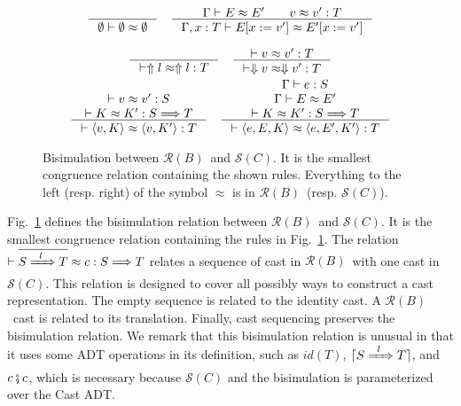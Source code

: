 \documentclass[runningheads]{llncs}
\newcommand{\infr}[2]{\inference{#1}{#2}}
\newcommand{\RMachine}[1]{\ensuremath{\mathcal{R}(#1)}}
\newcommand{\RBMachine}[0]{\RMachine{B}}
\newcommand{\SMachine}[1]{\ensuremath{\mathcal{S}(#1)}}
\newcommand{\error}[1]{\ensuremath{\Uparrow#1}}
\newcommand{\ccast}[3]{#1 \xRightarrow[]{\enskip #2 \enskip} #3}
\newcommand{\sexpr}[3]{\ensuremath{\langle#1,#2,#3\rangle}}
\newcommand{\scont}[2]{\ensuremath{\langle#1,#2\rangle}}
\newcommand{\shalt}[1]{\ensuremath{\Downarrow #1}}
\newcommand{\compose}[2]{\ensuremath{#1 \fatsemi #2}}
\newcommand{\translate}[1]{\ensuremath{\lceil#1\rceil}}
\newcommand{\id}[1]{\ensuremath{\mathit{id}(#1)}}
\newcommand{\expressiontyping}[3]{\ensuremath{#1 \vdash #2 : #3}}
\newcommand{\valuetyping}[2]{\ensuremath{\vdash #1 : #2}}
\newcommand{\casttyping}[3]{\ensuremath{\vdash #1 : #2 \Longrightarrow #3}}
\newcommand{\bisimE}[3]{\ensuremath{#1 \vdash #2 \approx #3}}
\newcommand{\bisimv}[3]{\valuetyping{#1 \approx #2}{#3}}
\newcommand{\bisimc}[4]{\casttyping{#1 \approx #2}{#3}{#4}}
\newcommand{\bisimK}[4]{\casttyping{#1 \approx #2}{#3}{#4}}
\newcommand{\bisims}[3]{\valuetyping{\ensuremath{#1 \approx #2}}{#3}}
\begin{document}
\begin{figure}
\fbox{\bisimE{\Gamma}{E}{E}}
\begin{gather*}
\inference{
}{
	\bisimE{\emptyset}{\emptyset}{\emptyset}
}
\quad
\inference{
	\Gamma \vdash E \approx E' \qquad
	v \approx v' : T
}{
	\Gamma , x : T \vdash 
	E [ x := v' ] \approx E' [ x := v' ]
}
\end{gather*}

\fbox{\bisims{s}{s}{T}}
\begin{gather*}
\infr{}{\bisims{\error{l}}{\error{l}}{T}} \quad
\infr{
	\bisimv{v}{v'}{T}
}{
	\bisims{\shalt{v}}{\shalt{v'}}{T}
}
\\
\infr{
	\bisimv{v}{v'}{S} \\
	\bisimK{K}{K'}{S}{T}
}{
	\bisims{\scont{v}{K}}{\scont{v}{K'}}{T}
} \quad
\infr{
	\expressiontyping{\Gamma}{e}{S} \\
	\bisimE{\Gamma}{E}{E'}          \\
	\bisimK{K}{K'}{S}{T}
}{
	\bisims{\sexpr{e}{E}{K}}{\sexpr{e}{E'}{K'}}{T}
}
\end{gather*}

\caption{Bisimulation between \RBMachine\ and \SMachine{C}. It is the smallest 
congruence relation containing the shown rules. Everything to the left (resp. 
right) of the 
symbol $\approx$ is in \RBMachine\ (resp. \SMachine{C}).}
\label{fig:bisim-SC-D}
\end{figure}

Fig.~\ref{fig:bisim-SC-D} defines the bisimulation relation between \RBMachine\ 
and \SMachine{C}. It is the smallest congruence relation containing the rules 
in Fig.~\ref{fig:bisim-SC-D}.
%
The relation $\bisimc{\overline{\ccast{S}{l}{T}}}{c}{S}{T}$ relates a sequence 
of cast in \RBMachine\ with one cast in \SMachine{C}. This relation is designed 
to cover all possibly ways to construct a cast representation. The empty 
sequence is related to the identity cast. A \RBMachine\ cast is related 
to its translation. Finally, cast sequencing preserves the bisimulation 
relation.
%
We remark that this bisimulation relation is unusual in that it uses
some ADT operations in its definition, such as $\id{T}$, 
$\translate{\ccast{S}{l}{T}}$, and $\compose{c}{c}$, which is necessary because 
\SMachine{C} and the bisimulation is parameterized over the Cast ADT.
\end{document}
